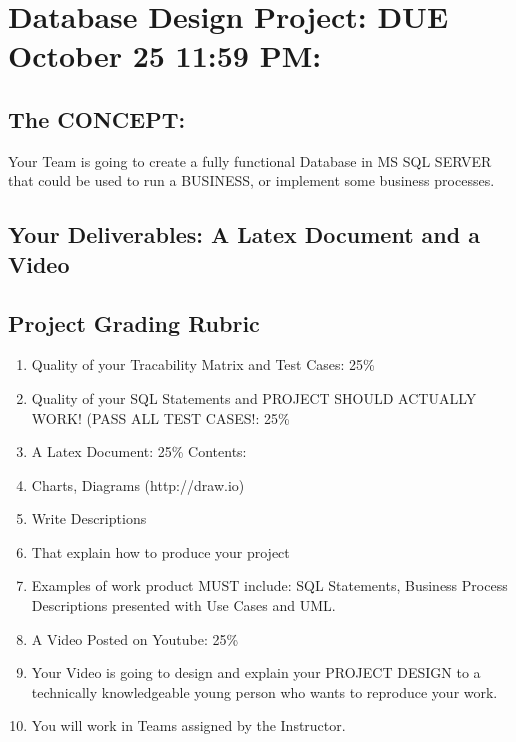 \newpage

\section{Database Design Project: DUE October 25  11:59 PM:}
\subsection{The CONCEPT:}

Your Team is going to create a fully functional Database in MS SQL SERVER that could be used to run a BUSINESS, or implement some business processes.
\subsection{Your Deliverables: A Latex Document and a Video}
\subsection{Project Grading Rubric}
\begin{enumerate}
    \item Quality of your Tracability Matrix and Test Cases: 25\%
    \item Quality of your SQL Statements and PROJECT SHOULD ACTUALLY WORK! (PASS ALL TEST CASES!:   25\%
    \item A Latex Document: 25\%   Contents:
    \item Charts, Diagrams (http://draw.io)    
    \item Write Descriptions  
    \item That explain how to produce your project  
    \item Examples of work product MUST include: SQL Statements, Business Process Descriptions presented with Use Cases and UML.
    \item A Video Posted on Youtube:  25\%
    \item Your Video is going to design and explain your PROJECT DESIGN to a technically knowledgeable young person who wants to reproduce your work.  
    \item You will work in Teams assigned by the Instructor.    
\end{enumerate}



\newpage

